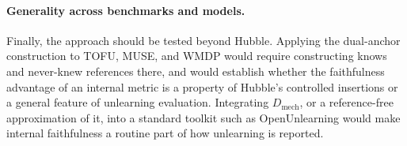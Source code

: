 \paragraph{Generality across benchmarks and models.}
Finally, the approach should be tested beyond Hubble. Applying the dual-anchor construction to TOFU, MUSE,
and WMDP would require constructing knows and never-knew references there, and would establish whether the
faithfulness advantage of an internal metric is a property of Hubble's controlled insertions or a general
feature of unlearning evaluation. Integrating $D_\text{mech}$, or a reference-free approximation of it, into
a standard toolkit such as OpenUnlearning \citep{dorna2025openunlearning} would make internal faithfulness a
routine part of how unlearning is reported.
